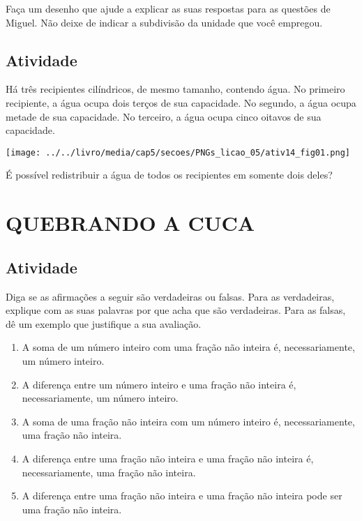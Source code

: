 Faça um desenho que ajude a explicar as suas respostas para as questões de Miguel. Não deixe de indicar a subdivisão da unidade que você empregou.

\subsection{Atividade}

Há três recipientes cilíndricos, de mesmo tamanho, contendo água. No primeiro recipiente, a água ocupa dois terços de sua capacidade. No segundo, a água ocupa metade de sua capacidade. No terceiro, a água ocupa cinco oitavos de sua capacidade.  
\begin{center}  
  \texttt{[image: ../../livro/media/cap5/secoes/PNGs\_licao\_05/ativ14\_fig01.png]}
\end{center}

É possível redistribuir a água de todos os recipientes em somente dois deles?

\section{QUEBRANDO A CUCA }

\subsection{Atividade}

Diga se as afirmações a seguir são verdadeiras ou falsas. Para as verdadeiras, explique com as suas palavras por que acha que são verdadeiras. Para as falsas, dê um exemplo que justifique a sua avaliação.
\begin{enumerate} [\quad a)] %
  \item     A soma de um número inteiro com uma fração não inteira é, necessariamente, um número inteiro.
  \item     A diferença entre um número inteiro e uma fração não inteira é, necessariamente, um número inteiro.
  \item     A soma de uma fração não inteira com um número inteiro é, necessariamente, uma fração não inteira.
  \item     A diferença entre uma fração não inteira e uma fração não inteira é, necessariamente, uma fração não inteira.
  \item     A diferença entre uma fração não inteira e uma fração não inteira pode ser uma fração não inteira.
\end{enumerate} %

